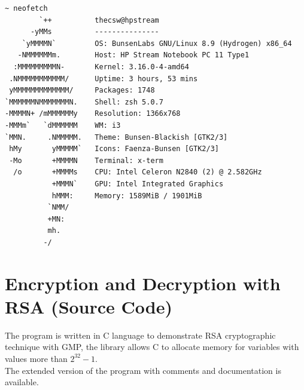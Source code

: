 \documentclass[a4paper, 12pt]{article}
\begin{document}
\begin{lstlisting}[caption=System Specifications]
  ~ neofetch
        `++          thecsw@hpstream
      -yMMs          ---------------
    `yMMMMN`         OS: BunsenLabs GNU/Linux 8.9 (Hydrogen) x86_64
   -NMMMMMMm.        Host: HP Stream Notebook PC 11 Type1 
  :MMMMMMMMMN-       Kernel: 3.16.0-4-amd64
 .NMMMMMMMMMMM/      Uptime: 3 hours, 53 mins
 yMMMMMMMMMMMMM/     Packages: 1748
`MMMMMMNMMMMMMMN.    Shell: zsh 5.0.7
-MMMMN+ /mMMMMMMy    Resolution: 1366x768
-MMMm`   `dMMMMMM    WM: i3
`MMN.     .NMMMMM.   Theme: Bunsen-Blackish [GTK2/3]
 hMy       yMMMMM`   Icons: Faenza-Bunsen [GTK2/3]
 -Mo       +MMMMN    Terminal: x-term
  /o       +MMMMs    CPU: Intel Celeron N2840 (2) @ 2.582GHz
           +MMMN`    GPU: Intel Integrated Graphics
           hMMM:     Memory: 1589MiB / 1901MiB
          `NMM/ 
          +MN:                               
          mh. 
         -/          
  \end{lstlisting}

\newpage 

\section{Encryption and Decryption with RSA (Source Code)}
\label{big}
The program is written in C\cite{Clang} language to demonstrate RSA cryptographic technique
with GMP\cite{gmp}, the library allows C to allocate memory for variables with values more than $2 ^{32} - 1$.\\

The extended version of the program with comments and documentation is available\cite{github}.
\end{document}
